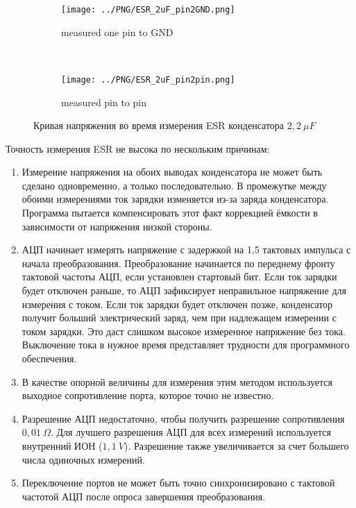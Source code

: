 \begin{figure}[H]
  \begin{subfigure}[b]{.5\textwidth}
    \centering
    \texttt{[image: ../PNG/ESR\_2uF\_pin2GND.png]}
    \caption{measured one pin to GND}
  \end{subfigure}
  ~ 
  \begin{subfigure}[b]{.5\textwidth}
    \centering
    \texttt{[image: ../PNG/ESR\_2uF\_pin2pin.png]}
    \caption{measured pin to pin}
  \end{subfigure}
  \caption{Кривая напряжения во время измерения ESR конденсатора \(2,2~\mu F\)}
  \label{pic:esr2}
\end{figure}


Точность измерения ESR не высока по нескольким причинам:
\begin{enumerate}
\item Измерение напряжения на обоих выводах конденсатора не может быть сделано одновременно, а только последовательно. 
В промежутке между обоими измерениями ток зарядки изменяется из-за заряда конденсатора. Программа пытается 
компенсировать этот  факт коррекцией ёмкости в зависимости от напряжения низкой стороны.
\item АЦП начинает измерять напряжение с задержкой на 1,5 тактовых импульса с начала преобразования. Преобразование 
начинается по переднему фронту тактовой частоты АЦП, если установлен стартовый бит. Если ток зарядки будет отключен 
раньше, то АЦП зафиксирует неправильное напряжение для измерения с током. Если ток зарядки будет отключен позже, 
конденсатор получит больший электрический заряд, чем при надлежащем измерении с током зарядки. Это даст слишком 
высокое измеренное  напряжение без тока. Выключение тока в нужное время представляет трудности для программного 
обеспечения.
\item В качестве опорной величины для измерения этим методом используется выходное сопротивление порта, которое 
точно не известно. 
\item Разрешение АЦП недостаточно, чтобы получить разрешение сопротивления \(0,01~\Omega\).
Для  лучшего разрешения АЦП для всех измерений используется внутренний ИОН (\(1,1~V\)). Разрешение также увеличивается 
за счет большего числа одиночных измерений.
\item Переключение портов не может быть точно синхронизировано с тактовой частотой АЦП после опроса завершения 
преобразования.
\end{enumerate}

